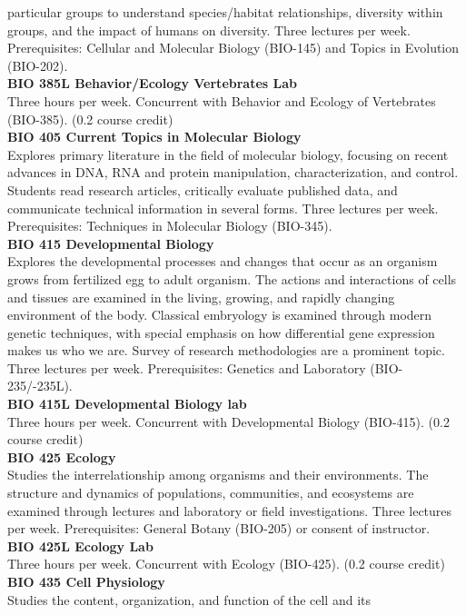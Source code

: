 \documentclass[
  letterpaper,
]{scrbook}
\begin{document}
particular groups to understand species/habitat relationships, diversity
within groups, and the impact of humans on diversity. Three lectures per
week. Prerequisites: Cellular and Molecular Biology (BIO-145) and Topics
in Evolution (BIO-202).\\
\textbf{BIO 385L Behavior/Ecology Vertebrates Lab}\\
Three hours per week. Concurrent with Behavior and Ecology of
Vertebrates (BIO-385). (0.2 course credit)\\
\textbf{BIO 405 Current Topics in Molecular Biology}\\
Explores primary literature in the field of molecular biology, focusing
on recent advances in DNA, RNA and protein manipulation,
characterization, and control. Students read research articles,
critically evaluate published data, and communicate technical
information in several forms. Three lectures per week. Prerequisites:
Techniques in Molecular Biology (BIO-345).\\
\textbf{BIO 415 Developmental Biology}\\
Explores the developmental processes and changes that occur as an
organism grows from fertilized egg to adult organism. The actions and
interactions of cells and tissues are examined in the living, growing,
and rapidly changing environment of the body. Classical embryology is
examined through modern genetic techniques, with special emphasis on how
differential gene expression makes us who we are. Survey of research
methodologies are a prominent topic. Three lectures per week.
Prerequisites: Genetics and Laboratory (BIO-235/-235L).\\
\textbf{BIO 415L Developmental Biology lab}\\
Three hours per week. Concurrent with Developmental Biology (BIO-415).
(0.2 course credit)\\
\textbf{BIO 425 Ecology}\\
Studies the interrelationship among organisms and their environments.
The structure and dynamics of populations, communities, and ecosystems
are examined through lectures and laboratory or field investigations.
Three lectures per week. Prerequisites: General Botany (BIO-205) or
consent of instructor.\\
\textbf{BIO 425L Ecology Lab}\\
Three hours per week. Concurrent with Ecology (BIO-425). (0.2 course
credit)\\
\textbf{BIO 435 Cell Physiology}\\
Studies the content, organization, and function of the cell and its
\end{document}
